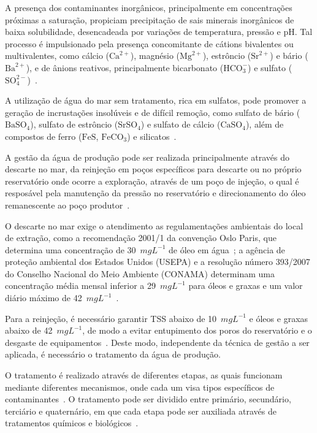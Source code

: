 A presença dos contaminantes inorgânicos, principalmente em concentrações próximas a saturação, propiciam precipitação de sais minerais inorgânicos de baixa solubilidade, desencadeada por variações de temperatura, pressão e pH. Tal processo é impulsionado pela presença concomitante de cátions bivalentes ou multivalentes, como cálcio ($\text{Ca}^{2+}$), magnésio ($\text{Mg}^{2+}$), estrôncio ($\text{Sr}^{2+}$) e bário ($\text{Ba}^{2+}$), e de ânions reativos, principalmente bicarbonato ($\text{HCO}_3^-$) e sulfato ($\text{SO}_4^{2-}$)~\cite{AKSTINAT2019124011,Rajbongshi2024ProducedWaterReview,Ghafoori2022ProducedWater}.

A utilização de água do mar sem tratamento, rica em sulfatos, pode promover a geração  de incrustações insolúveis e de difícil remoção, como sulfato de bário ($\text{BaSO}_4$), sulfato de estrôncio ($\text{SrSO}_4$) e sulfato de cálcio ($\text{CaSO}_4$), além de compostos de ferro ($\text{FeS}$, $\text{FeCO}_3$) e silicatos~\cite{AKSTINAT2019124011,Rajbongshi2024ProducedWaterReview}.

A gestão da água de produção pode ser realizada principalmente através do descarte no mar, da reinjeção em poços específicos para descarte ou no próprio reservatório onde ocorre a exploração, através de um poço de injeção, o qual é resposável pela manutenção da pressão no reservatório e direcionamento do óleo remanescente ao poço produtor~\cite{Ghafoori2022ProducedWater,Jimenez2018ProducedWater}. 

O descarte no mar exige o atendimento as regulamentações ambientais do local de extração, como a recomendação 2001/1 da convenção Oslo Paris, que determina uma concentração de 30~$mgL^{-1}$ de óleo em água~\cite{OSPAR2001}; a agência de proteção ambiental dos Estados Unidos (USEPA) e a resolução número 393/2007 do Conselho Nacional do Meio Ambiente (CONAMA) determinam uma concentração média mensal inferior a 29~$mgL^{-1}$ para óleos e graxas e um valor diário máximo de 42~$mgL^{-1}$~\cite{EPA435,CONAMA3932007}.  

Para a reinjeção, é necessário garantir TSS abaixo de 10~$mgL^{-1}$ e óleos e graxas abaixo de 42~$mgL^{-1}$, de modo a evitar entupimento dos poros do reservatório e o desgaste de equipamentos~\cite{Ghafoori2022ProducedWater,Jimenez2018ProducedWater}. Deste modo, independente da técnica de gestão a ser aplicada, é necessário o tratamento da água de produção.

O tratamento é realizado através de diferentes etapas, as quais funcionam mediante diferentes mecanismos, onde cada um visa tipos específicos de contaminantes~\cite{Devold2013,Hoek2021}. O tratamento pode ser dividido entre primário, secundário, terciário e quaternário, em que cada etapa pode ser auxiliada através de tratamentos químicos e biológicos~\cite{Amakiri2022,FakhrulRazi2009}. 

